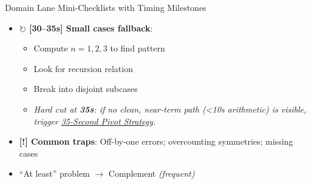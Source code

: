 \documentclass{article}
\newcommand{\timer}[1]{\textbf{\textcolor{timegreen}{#1}}}
\begin{document}
\begin{classifybox}{Domain Lane Mini-Checklists with Timing Milestones}
\begin{itemize}[nosep]
\begin{itemize}[nosep]
        \item Check magnitude reasonable for problem number
        \item Overlaps present? Apply PIE with at most 2 inclusion levels in this window.
        \end{itemize}
      \item \textbf{$\circlearrowright$ [30--35s] Small cases fallback}:
        \begin{itemize}[nosep]
        \item Compute $n=1,2,3$ to find pattern
        \item Look for recursion relation
        \item Break into disjoint subcases
        \item \emph{Hard cut at \timer{35s}: if no clean, near-term path (<10s arithmetic) is visible, trigger \hyperlink{pivot35}{35-Second Pivot Strategy}.}
        \end{itemize}
      \item \textbf{[!] Common traps}: Off-by-one errors; overcounting symmetries; missing cases
      \item {} ``At least'' problem $\rightarrow$ Complement \emph{(frequent)}
      \end{itemize}
      
      \vspace{3mm}

\end{classifybox}
\end{document}
